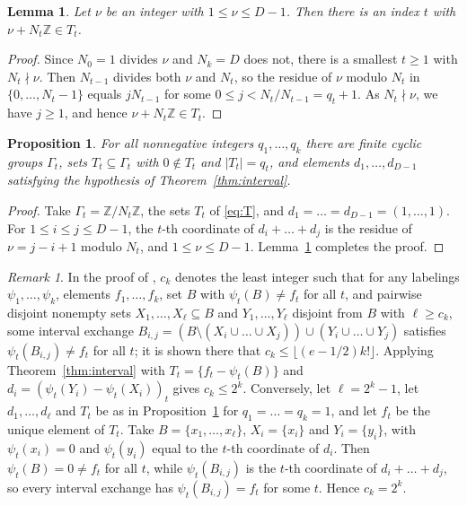 \documentclass{amsart}
\newtheorem{lemma}[theorem]{Lemma}
\newtheorem{proposition}[theorem]{Proposition}
\theoremstyle{definition}
\theoremstyle{remark}
\newtheorem{remark}[theorem]{Remark}
\newcommand{\Z}{\mathbb{Z}}
\begin{document}
\begin{lemma}\label{lem:radix}
Let $\nu$ be an integer with $1\le\nu\le D-1$. Then there is an index $t$ with $\nu+N_t\Z\in T_t$.
\end{lemma}

\begin{proof}
Since $N_0=1$ divides $\nu$ and $N_k=D$ does not, there is a smallest $t\ge1$ with $N_t\nmid\nu$. Then $N_{t-1}$ divides both $\nu$ and $N_t$, so the residue of $\nu$ modulo $N_t$ in $\{0,\dots,N_t-1\}$ equals $jN_{t-1}$ for some $0\le j<N_t/N_{t-1}=q_t+1$. As $N_t\nmid\nu$, we have $j\ge1$, and hence $\nu+N_t\Z\in T_t$.
\end{proof}

\begin{proposition}\label{prop:interval-sharp}
For all nonnegative integers $q_1,\dots,q_k$ there are finite cyclic groups $\Gamma_t$, sets $T_t\subseteq\Gamma_t$ with $0\notin T_t$ and $|T_t|=q_t$, and elements $d_1,\dots,d_{D-1}$ satisfying the hypothesis of Theorem~\ref{thm:interval}.
\end{proposition}

\begin{proof}
Take $\Gamma_t=\Z/N_t\Z$, the sets $T_t$ of \eqref{eq:T}, and $d_1=\dots=d_{D-1}=(1,\dots,1)$. For $1\le i\le j\le D-1$, the $t$-th coordinate of $d_i+\dots+d_j$ is the residue of $\nu=j-i+1$ modulo $N_t$, and $1\le\nu\le D-1$. Lemma~\ref{lem:radix} completes the proof.
\end{proof}

\begin{remark}\label{rem:ck}
In the proof of \cite[Lemma~5.2]{GMOSY}, $c_k$ denotes the least integer such that for any labelings $\psi_1,\dots,\psi_k$, elements $f_1,\dots,f_k$, set $B$ with $\psi_t(B)\ne f_t$ for all $t$, and pairwise disjoint nonempty sets $X_1,\dots,X_\ell\subseteq B$ and $Y_1,\dots,Y_\ell$ disjoint from $B$ with $\ell\ge c_k$, some interval exchange $B_{i,j}=(B\setminus(X_i\cup\dots\cup X_j))\cup(Y_i\cup\dots\cup Y_j)$ satisfies $\psi_t(B_{i,j})\ne f_t$ for all $t$; it is shown there that $c_k\le\lfloor(e-1/2)k!\rfloor$. Applying Theorem~\ref{thm:interval} with $T_t=\{f_t-\psi_t(B)\}$ and $d_i=(\psi_t(Y_i)-\psi_t(X_i))_t$ gives $c_k\le2^k$. Conversely, let $\ell=2^k-1$, let $d_1,\dots,d_\ell$ and $T_t$ be as in Proposition~\ref{prop:interval-sharp} for $q_1=\dots=q_k=1$, and let $f_t$ be the unique element of $T_t$. Take $B=\{x_1,\dots,x_\ell\}$, $X_i=\{x_i\}$ and $Y_i=\{y_i\}$, with $\psi_t(x_i)=0$ and $\psi_t(y_i)$ equal to the $t$-th coordinate of $d_i$. Then $\psi_t(B)=0\ne f_t$ for all $t$, while $\psi_t(B_{i,j})$ is the $t$-th coordinate of $d_i+\dots+d_j$, so every interval exchange has $\psi_t(B_{i,j})=f_t$ for some $t$. Hence $c_k=2^k$.
\end{remark}
\end{document}
